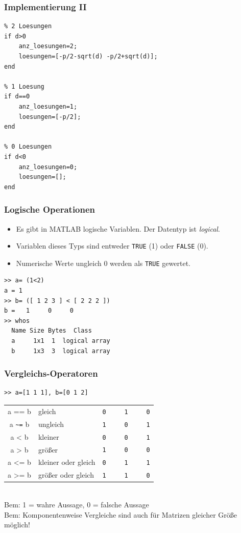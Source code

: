 %
%
%
\begin{frame}[fragile]\frametitle{Implementierung II}
\begin{lstlisting}
% 2 Loesungen
if d>0 
    anz_loesungen=2;
    loesungen=[-p/2-sqrt(d) -p/2+sqrt(d)];
end

% 1 Loesung
if d==0 
    anz_loesungen=1;
    loesungen=[-p/2];
end

% 0 Loesungen
if d<0 
    anz_loesungen=0;
    loesungen=[];
end
\end{lstlisting}
\end{frame}
%
%
%
\begin{frame}[fragile]\frametitle{Logische Operationen}
\begin{itemize}
\item Es gibt in MATLAB logische Variablen. Der Datentyp ist {\it
  logical}. 
\item Variablen dieses Typs sind entweder \lstinline!TRUE! (1) oder
  \lstinline!FALSE! (0).
\item Numerische Werte ungleich $0$ werden als \lstinline!TRUE! gewertet.
\end{itemize}
\begin{lstlisting}
>> a= (1<2)
a = 1
>> b= ([ 1 2 3 ] < [ 2 2 2 ])
b =   1     0     0
>> whos
  Name Size Bytes  Class
  a     1x1  1  logical array
  b     1x3  3  logical array
\end{lstlisting}
\end{frame}
%
%
%
\begin{frame}[fragile]\frametitle{Vergleichs-Operatoren}
\begin{lstlisting} 
>> a=[1 1 1], b=[0 1 2] 
\end{lstlisting}
\begin{tabular}{cll}
a == b & gleich &   \lstinline!0     1     0!\\
a \lstinline!~=! b & ungleich & \lstinline!1     0     1!\\
a < b & kleiner & \lstinline!0     0     1!\\
a > b & größer & \lstinline!1     0     0!\\
a <= b & kleiner oder gleich & \lstinline!0     1     1!\\
a >= b & größer oder gleich & \lstinline!1     1     0!\\
\end{tabular}
\\
\alert{Bem:} \alert{ 1 = wahre Aussage, 0 = falsche Aussage}\\
\alert{Bem:} Komponentenweise Vergleiche sind auch für Matrizen
gleicher Größe möglich! 
\end{frame}
